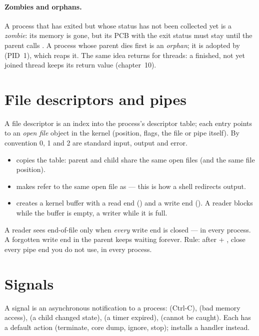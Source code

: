 \paragraph{Zombies and orphans.} A process that has exited but whose
status has not been collected yet is a \emph{zombie}: its memory is gone,
but its PCB with the exit status must stay until the parent calls
. A process whose parent dies first is an \emph{orphan}; it is
adopted by  (PID~1), which reaps it. The same idea returns for
threads: a finished, not yet joined thread keeps its return value
(chapter~10).

\section{File descriptors and pipes}

A file descriptor is an index into the process's descriptor table; each
entry points to an \emph{open file} object in the kernel (position,
flags, the file or pipe itself). By convention 0, 1 and 2 are standard
input, output and error.

\begin{itemize}
  \item {} copies the table: parent and child share the same open
    files (and the same file position).
  \item {} makes  refer to the same open file
    as  --- this is how a shell redirects output.
  \item {} creates a kernel buffer with a read end
    () and a write end (). A reader blocks while
    the buffer is empty, a writer while it is full.
\end{itemize}

\begin{warnbox}
A reader sees end-of-file only when \emph{every} write end is closed ---
in every process. A forgotten write end in the parent keeps 
waiting forever. Rule: after  + , close every pipe
end you do not use, in every process.
\end{warnbox}

\section{Signals}

A signal is an asynchronous notification to a process: 
(Ctrl-C),  (bad memory access),  (a child
changed state),  (a timer expired),  (cannot
be caught). Each has a default action (terminate, core dump, ignore,
stop);  installs a handler instead.

